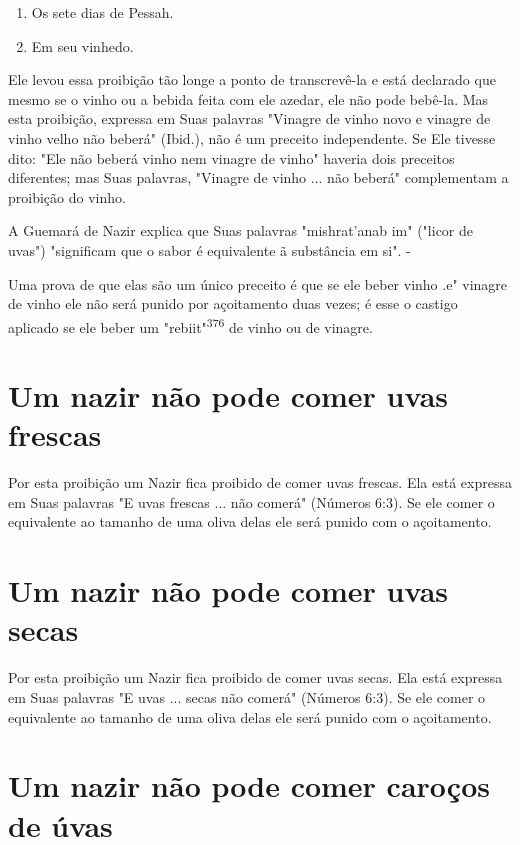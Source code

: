 \begin{itemize}
\begin{enumrate}
\begin{itemize}
\begin{itemize}
\begin{itemize}
\begin{enumerate}
\def\labelenumi{\arabic{enumi}.}
\setcounter{enumi}{373}
\item
 
 Os sete dias de Pessah.
 
\item
 
 Em seu vinhedo.
 
\end{enumerate}

Ele levou essa proibição tão longe a ponto de transcrevê-la e está
declarado que mesmo se o vinho ou a bebida feita com ele azedar, ele não
po­de bebê-la. Mas esta proibição, expressa em Suas palavras "Vinagre de
vinho novo e vinagre de vinho velho não beberá" (Ibid.), não é um
preceito indepen­dente. Se Ele tivesse dito: "Ele não beberá vinho nem
vinagre de vinho" have­ria dois preceitos diferentes; mas Suas palavras,
"Vinagre de vinho ... não be­berá" complementam a proibição do vinho.

A Guemará de Nazir explica que Suas palavras "mishrat'anab im" ("li­cor
de uvas") "significam que o sabor é equivalente ã substância em si". -

Uma prova de que elas são um único preceito é que se ele beber vi­nho
.e" vinagre de vinho ele não será punido por
açoitamento duas vezes; é esse o castigo aplicado se ele beber um
"rebiit"\textsuperscript{376} de vinho ou de vinagre.

\section{Um nazir não pode comer uvas frescas}

Por esta proibição um Nazir fica proibido de comer uvas frescas. Ela
está expressa em Suas palavras "E uvas frescas ... não comerá" (Números
6:3). Se ele comer o equivalente ao tamanho de uma oliva delas ele será
punido com o açoitamento.

\section{Um nazir não pode comer uvas secas}

Por esta proibição um Nazir fica proibido de comer uvas secas. Ela está
expressa em Suas palavras "E uvas ... secas não comerá" (Números 6:3).
Se ele comer o equivalente ao tamanho de uma oliva delas ele será punido
com o açoitamento.

\section{Um nazir não pode comer caroços de úvas}


\end{itemize}
\end{itemize}
\end{itemize}
\end{enumrate}
\end{itemize}
